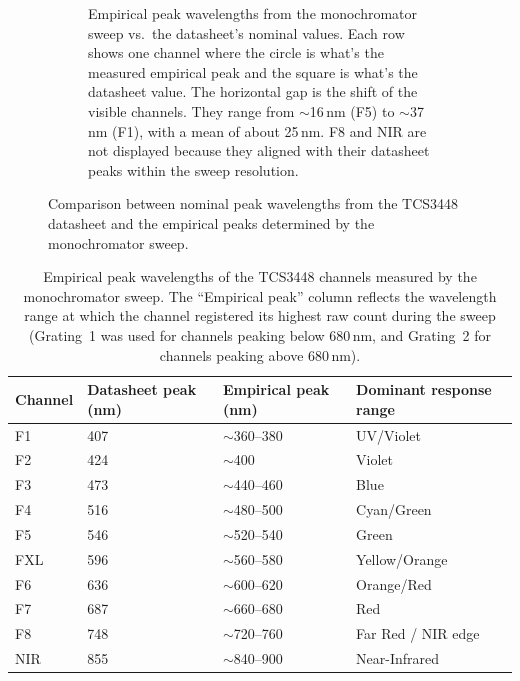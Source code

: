 \begin{figure}[H]
\begin{subfigure}[b]{0.48\textwidth}
\begin{tikzpicture}
    \end{tikzpicture}
        \caption{Empirical peak wavelengths from the monochromator sweep vs.\ the datasheet's nominal values. Each row shows one channel where the circle is what's the measured empirical peak and the square is what's the datasheet value. The horizontal gap is the shift of the visible channels. They range from $\sim$16\,nm (F5) to $\sim$37\,nm (F1), with a mean of about 25\,nm. F8 and NIR are not displayed because they aligned with their datasheet peaks within the sweep resolution.}
        \label{fig:tcs3448-empirical-response}
    \end{subfigure}
    \caption[TCS3448 Spectral Channel Peak Wavelengths: Datasheet vs.\ Empirical]{Comparison between nominal peak wavelengths from the TCS3448 datasheet and the empirical peaks determined by the monochromator sweep.}
    \label{fig:tcs3448-comparison}
\end{figure}

\clearpage
\begin{table}[htbp]
\centering
\caption[TCS3448 Empirical Channel Peak Wavelengths]{Empirical peak wavelengths of the TCS3448 channels measured by the monochromator sweep. The ``Empirical peak'' column reflects the wavelength range at which the channel registered its highest raw count during the sweep (Grating~1 was used for channels peaking below 680\,nm, and Grating~2 for channels peaking above 680\,nm).}
\label{tab:tcs3448-channel-mapping}
\small
\setlength{\tabcolsep}{5pt}
\renewcommand{\arraystretch}{1.25}
\begin{tabularx}{\textwidth}{|P{1.5cm}|X|X|P{4.5cm}|}
\hline
\textbf{Channel} & \textbf{Datasheet peak (nm)} & \textbf{Empirical peak (nm)} & \textbf{Dominant response range} \\
\hline
F1 & 407 & $\sim$360--380 & UV/Violet \\
\hline
F2 & 424 & $\sim$400 & Violet \\
\hline
F3 & 473 & $\sim$440--460 & Blue \\
\hline
F4 & 516 & $\sim$480--500 & Cyan/Green \\
\hline
F5 & 546 & $\sim$520--540 & Green \\
\hline
FXL & 596 & $\sim$560--580 & Yellow/Orange \\
\hline
F6 & 636 & $\sim$600--620 & Orange/Red \\
\hline
F7 & 687 & $\sim$660--680 & Red \\
\hline
F8 & 748 & $\sim$720--760 & Far Red / NIR edge \\
\hline
NIR & 855 & $\sim$840--900 & Near-Infrared \\
\hline
\end{tabularx}

\vspace{0.4em}
\end{table}

